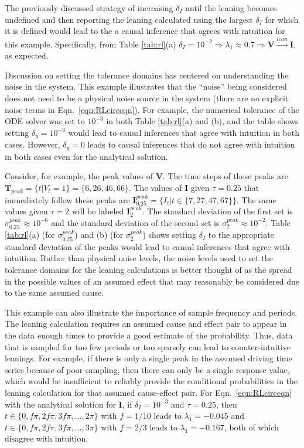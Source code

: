 \documentclass[a4paper,11pt,twocolumn]{article}
\begin{document}
The previously discussed strategy of increasing $\delta_I$ until the leaning becomes undefined and then reporting the leaning calculated using the largest $\delta_I$ for which it is defined would lead to the a causal inference that agrees with intuition for this example.  Specifically, from Table \ref{tab:rl}(a) $\delta_I=10^{-2}\Rightarrow\lambda_1\approx 0.7\Rightarrow\mathbf{V}\xrightarrow{lean}\mathbf{I}$, as expected.  

Discussion on setting the tolerance domains has centered on understanding the noise in the system.  This example illustrates that the ``noise'' being considered does not need to be a physical noise source in the system (there are no explicit noise terms in Eqn.\ \ref{eqn:RLcirceqn}).  For example, the numerical tolerance of the ODE solver was set to $10^{-3}$ in both Table \ref{tab:rl}(a) and (b), and the table shows setting $\delta_y=10^{-3}$ would lead to causal inferences that agree with intuition in both cases.  However, $\delta_y=0$ leads to causal inferences that do not agree with intuition in both cases even for the analytical solution.  

Consider, for example, the peak values of $\mathbf{V}$.  The time steps of these peaks are $\mathbf{T}_{peak} = \{t|V_t =1\} = \{6,26,46,66\}$.  The values of $\mathbf{I}$ given $\tau = 0.25$ that immediately follow these peaks are $\mathbf{I}^{peak}_{0.25} = \{I_t|t\in\{7,27,47,67\}\}$.  The same values given $\tau=2$ will be labeled $\mathbf{I}^{peak}_2$.  The standard deviation of the first set is $\sigma_{0.25}^{peak} \approx 10^{-6}$ and the standard deviation of the second set is $\sigma_{2}^{peak} \approx 10^{-2}$.  Table \ref{tab:rl}(a) (for $\sigma_{0.25}^{peak}$) and (b) (for $\sigma_{2}^{peak}$) shows setting $\delta_I$ to the appropriate standard deviation of the peaks would lead to causal inferences that agree with intuition.  Rather than physical noise levels, the noise levels used to set the tolerance domains for the leaning calculations is better thought of as the spread in the possible values of an assumed effect that may reasonably be considered due to the same assumed cause.  
    
This example can also illustrate the importance of sample frequency and periods.  The leaning calculation requires an assumed cause and effect pair to appear in the data enough times to provide a good estimate of the probability.  Thus, data that is sampled for too few periods or too sparsely can lead to counter-intuitive leanings.  For example, if there is only a single peak in the assumed driving time series because of poor sampling, then there can only be a single response value, which would be insufficient to reliably provide the conditional probabilities in the leaning calculation for that assumed cause-effect pair.  For Eqn.\ \ref{eqn:RLcirceqn} with the analytical solution for $\mathbf{I}$, if $\delta_I=10^{-3}$ and $\tau = 0.25$, then $t\in\{0,f\pi,2f\pi,3f\pi,\ldots,2\pi\}$ with $f=1/10$ leads to $\lambda_1 = -0.045$ and $t\in\{0,f\pi,2f\pi,3f\pi,\ldots,3\pi\}$ with $f=2/3$ leads to $\lambda_1 = -0.167$, both of which disagree with intuition.
\end{document}

